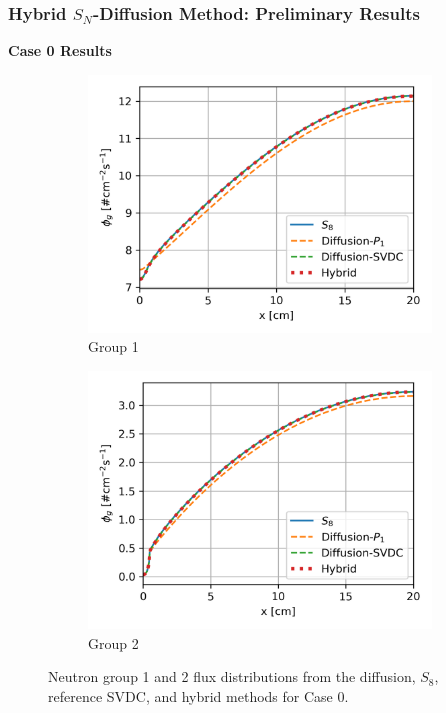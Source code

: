 \begin{frame}
  \frametitle{Hybrid $S_N$-Diffusion Method: Preliminary Results}
  \textbf{Case 0 Results}
  \begin{figure}
    \centering
    \begin{subfigure}[b]{.49\textwidth}
      \centering
      \includegraphics[width=\textwidth]{../images/case-0-group-1-hybrid-flux}
      \caption{Group 1}
      \label{fig:c0g1hf}
    \end{subfigure}
    \hfill
    \begin{subfigure}[b]{.49\textwidth}
      \centering
      \includegraphics[width=\textwidth]{../images/case-0-group-2-hybrid-flux}
      \caption{Group 2}
      \label{fig:c0g2hf}
    \end{subfigure}
    \caption{Neutron group 1 and 2 flux distributions from the diffusion, $S_8$, reference
    \gls{SVDC}, and hybrid methods for Case 0.}
  \end{figure}
\end{frame}

